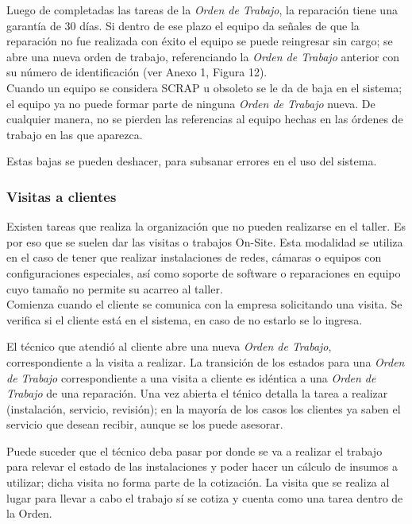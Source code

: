 \documentclass[12pt]{extarticle}
\begin{document}
\begin{spacing}{1.2}
    Luego de completadas las tareas de la \textit{Orden de Trabajo}, la reparación tiene una garantía de 30 días. Si dentro de ese plazo el equipo da señales de que la reparación no fue realizada con éxito el equipo se puede reingresar sin cargo; se abre una nueva orden de trabajo, referenciando la \textit{Orden de Trabajo} anterior con su número de identificación (ver Anexo 1, Figura 12). \\
    
    Cuando un equipo se considera SCRAP u obsoleto se le da de baja en el sistema; el equipo ya no puede formar parte de ninguna \textit{Orden de Trabajo} nueva. De cualquier manera, no se pierden las referencias al equipo hechas en las órdenes de trabajo en las que aparezca.

    Estas bajas se pueden deshacer, para subsanar errores en el uso del sistema.

    \subsubsection{Visitas a clientes}

    Existen tareas que realiza la organización que no pueden realizarse en el taller. Es por eso que se suelen dar las visitas o trabajos On-Site. Esta modalidad se utiliza en el caso de tener que realizar instalaciones de redes, cámaras o equipos con configuraciones especiales, así como soporte de software o reparaciones en equipo cuyo tamaño no permite su acarreo al taller.\\

    Comienza cuando el cliente se comunica con la empresa solicitando una visita. Se verifica si el cliente está en el sistema, en caso de no estarlo se lo ingresa.

    El técnico que atendió al cliente abre una nueva \textit{Orden de Trabajo}, correspondiente a la visita a realizar. La transición de los estados para una \textit{Orden de Trabajo} correspondiente a una visita a cliente es idéntica a una \textit{Orden de Trabajo} de una reparación. 
    Una vez abierta el ténico detalla la tarea a realizar (instalación, servicio, revisión); en la mayoría de los casos los clientes ya saben el servicio que desean recibir, aunque se los puede asesorar.

    Puede suceder que el técnico deba pasar por donde se va a realizar el trabajo para relevar el estado de las instalaciones y poder hacer un cálculo de insumos a utilizar; dicha visita no forma parte de la cotización. La visita que se realiza al lugar para llevar a cabo el trabajo sí se cotiza y cuenta como una tarea dentro de la Orden.\\


\end{spacing}
\end{document}

